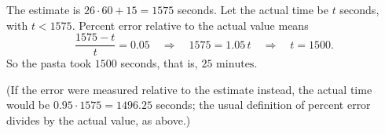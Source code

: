 The estimate is $26\cdot60+15=1575$ seconds. Let the actual time be $t$ seconds, with $t<1575$. Percent error relative to the actual value means
\[
\dfrac{1575-t}{t}=0.05\quad\Longrightarrow\quad 1575=1.05\,t\quad\Longrightarrow\quad t=1500 .
\]
So the pasta took $1500$ seconds, that is, $\boxed{25\text{ minutes}}$.

(If the error were measured relative to the estimate instead, the actual time would be $0.95\cdot1575=1496.25$ seconds; the usual definition of percent error divides by the actual value, as above.)
